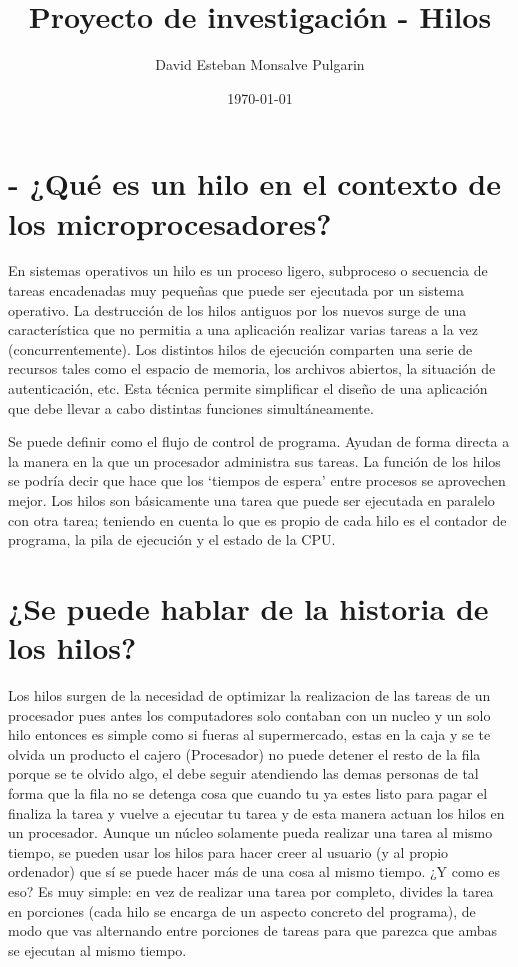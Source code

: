 \documentclass{article}
\title{Proyecto de investigación - Hilos}
\author{David Esteban Monsalve Pulgarin}
\date{\today}
\begin{document}
\maketitle

\section{- ¿Qué es un hilo en el contexto de los microprocesadores?}
\par
En sistemas operativos un hilo es un proceso ligero, subproceso o secuencia de tareas encadenadas muy pequeñas que puede ser ejecutada por un sistema operativo. La destrucción de los hilos antiguos por los nuevos surge de una característica que no permitia a una aplicación realizar varias tareas a la vez (concurrentemente). Los distintos hilos de ejecución comparten una serie de recursos tales como el espacio de memoria, los archivos abiertos, la situación de autenticación, etc. Esta técnica permite simplificar el diseño de una aplicación que debe llevar a cabo distintas funciones simultáneamente.

Se puede definir como el flujo de control de programa. Ayudan de forma directa a la manera en la que un procesador administra sus tareas. La función de los hilos se podría decir que hace que los ‘tiempos de espera’ entre procesos se aprovechen mejor. Los hilos son básicamente una tarea que puede ser ejecutada en paralelo con otra tarea; teniendo en cuenta lo que es propio de cada hilo es el contador de programa, la pila de ejecución y el estado de la CPU.


\section{¿Se puede hablar de la historia de los hilos?}
\par
Los hilos surgen de la necesidad de optimizar la realizacion de las tareas de un procesador pues antes los computadores solo contaban con un nucleo y un solo hilo entonces es simple como si fueras al supermercado, estas en la caja y se te olvida un producto el cajero (Procesador) no puede detener el resto de la fila porque se te olvido algo, el debe seguir atendiendo las demas personas de tal forma que la fila no se detenga cosa que cuando tu ya estes listo para pagar el finaliza la tarea y vuelve a ejecutar tu tarea y de esta manera actuan los hilos en un procesador. Aunque un núcleo solamente pueda realizar una tarea al mismo tiempo, se pueden usar los hilos para hacer creer al usuario (y al propio ordenador) que sí se puede hacer más de una cosa al mismo tiempo.
¿Y como es eso? Es muy simple: en vez de realizar una tarea por completo, divides la tarea en porciones (cada hilo se encarga de un aspecto concreto del programa), de modo que vas alternando entre porciones de tareas para que parezca que ambas se ejecutan al mismo tiempo.
\end{document}
